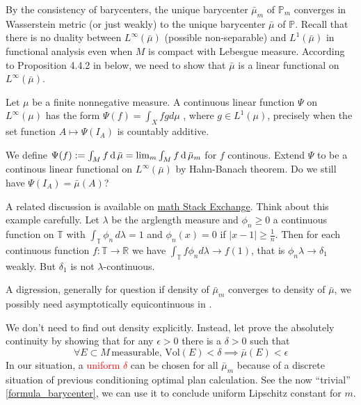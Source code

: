 By the consistency of barycenters, the unique barycenter $\bar{\mu}_m$ of $\mathbb{P}_m$
converges in Wasserstein metric (or just weakly) to the unique barycenter $\bar{\mu}$ of $\mathbb{P}$.
Recall that there is no duality between $L^{\infty}(\bar{\mu})$ (possible non-separable) and $L^1 (\bar{\mu})$
in functional analysis even when $M$ is compact with Lebesgue measure.
According to Proposition 4.4.2 in \cite{Bogachev2007} below, we need to show that $\bar{\mu}$ is a linear functional on $L^{\infty}(\bar{\mu})$.
\begin{prop}
	Let \( \mu \) be a finite nonnegative measure.
	A continuous linear function \( \Psi \) on \( L ^ { \infty } ( \mu ) \) has the form
	\( \Psi ( f ) = \int _ { X } f g d \mu \)
	, where \( g \in L ^ { 1 } ( \mu ) \),
	precisely when the set function \( A \mapsto \Psi \left( I _ { A } \right) \) is countably additive.
\end{prop}

We define $\Psi(f):= \int_M f \operatorname{d} \bar{\mu} = \lim_m \int_M f \operatorname{d} \bar{\mu}_m$ for $f$ continous.
Extend $\Psi$ to be a continous linear functional on $L^{\infty}(\bar{\mu})$ by Hahn-Banach theorem.
Do we still have $\Psi(I_A) = \bar{\mu}(A)$?

A related discussion is available on
\href{https://math.stackexchange.com/questions/574130/does-weak-convergence-with-uniformly-bounded-densities-imply-absolute-continuity/574888#574888}{math Stack Exchange}.
Think about this example carefully.
Let $\lambda$ be the arglength measure and $\phi_n \ge 0$ a continuous function on $\mathbb T$ with $\int_{\mathbb T} \phi_n\, d\lambda = 1$ and $\phi_n(x) = 0$ if $|x-1| \ge \frac 1n$. Then for each continuous function $f\colon \mathbb T \to \mathbb R$ we have $\int_{\mathbb T} f\phi_n d\lambda \to f(1)$, that is $\phi_n \lambda \to \delta_1$ weakly. But $\delta_1$ is not $\lambda$-continuous.

A digression, generally for question if density of $\bar{\mu}_m$ converges to density of $\bar{\mu}$,
we possibly need asymptotically equicontinuous in \cite{Sweeting1986Converse}.

We don't need to find out density explicitly.
Instead, let prove the absolutely continuity by showing that
for any $\epsilon > 0$ there is a $\delta > 0$ such that
\begin{equation}
	\label{equa:absolutely_continous}
	\forall E \subset M \, \text{measurable, } \text{Vol}(E) < \delta
	\implies \bar{\mu}(E) < \epsilon
\end{equation}
In our situation, a \textcolor{red}{uniform $\delta$} can be chosen for all $\bar{\mu}_m$
because of a discrete situation of previous conditioning optimal plan calculation.
See the now ``trivial'' \cref{formula_barycenter},
we can use it to conclude uniform Lipschitz constant for $m$.

